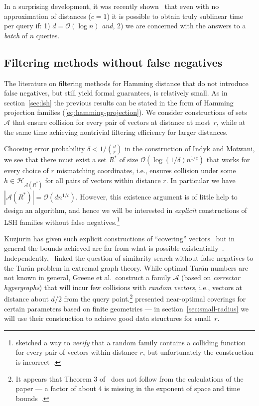\documentclass[prodmode,acmtalg]{acmsmall}
\newcommand{\Osymbol}{{\mathcal O}}
\newcommand{\BO}[1]{\Osymbol\left(#1\right)}
\begin{document}
In a surprising development, it was recently shown~\cite{DBLP:conf/focs/AlmanW15} that even with no approximation of distances ($c=1$) it is possible to obtain truly sublinear time per query if: 1) $d=\BO{\log n}$ \emph{and}, 2) we are concerned with the answers to a \emph{batch} of $n$ queries.


\subsection{Filtering methods without false negatives}\label{sec:nofalseneg}

The literature on filtering methods for Hamming distance that do not introduce false negatives, but still yield formal guarantees, is relatively small. 
As in section~\ref{sec:lsh} the previous results can be stated in the form of Hamming projection families (\ref{eq:hamming-projection}).
We consider constructions of sets $\mathcal{A}$ that ensure collision for every pair of vectors at distance at most~$r$, while at the same time achieving nontrivial filtering efficiency for larger distances.

Choosing error probability $\delta < 1/\binom{d}{r}$ in the construction of Indyk and Motwani, we see that there must exist a set $R^*$ of size $\BO{\log(1/\delta) n^{1/c}}$ that works for every choice of $r$ mismatching coordinates, i.e., ensures collision under some $h\in \mathcal{H}_{\mathcal{A}(R^*)}$ for all pairs of vectors within distance $r$. In particular we have $|\mathcal{A}(R^*)| = \BO{d n^{1/c}}$. However, this existence argument is of little help to design an algorithm, and hence we will be interested in \emph{explicit} constructions of LSH families without false negatives.\footnote{\cite{DBLP:conf/soda/Indyk00} sketched a way to \emph{verify} that a random family contains a colliding function for every pair of vectors within distance $r$, but unfortunately the construction is incorrect~\cite{IndykPersonalCommunication2015}.}

Kuzjurin has given such explicit constructions of ``covering'' vectors~\cite{kuzjurin2000explicit} but in general the bounds achieved are far from what is possible existentially~\cite{Kuzjurin:1995:DAG:204515.204520}.
Independently,~\cite{greene1994multi} linked the question of similarity search without false negatives to the Turán problem in extremal graph theory.
While optimal Turán numbers are not known in general, Greene et al.~construct a family $\mathcal{A}$ (based on \emph{corrector hypergraphs}) that will incur few collisions with \emph{random vectors}, i.e., vectors at distance about $d/2$ from the query point.\footnote{It appears that Theorem 3 of~\cite{greene1994multi} does not follow from the calculations of the paper --- a factor of about 4 is missing in the exponent of space and time bounds~\cite{ParnasPersonalCommunication}.}
\cite{gordon1995new} presented near-optimal coverings for certain parameters based on finite geometries --- in section~\ref{sec:small-radius} we will use their construction to achieve good data structures for small~$r$.
\end{document}
